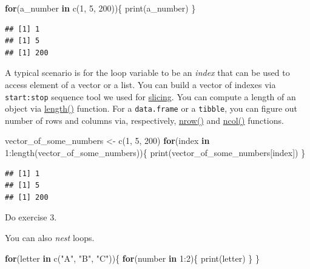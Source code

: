 \documentclass[
]{book}
\newenvironment{Shaded}{\begin{snugshade}}{\end{snugshade}}
\newcommand{\ControlFlowTok}[1]{\textcolor[rgb]{0.13,0.29,0.53}{\textbf{#1}}}
\newcommand{\DecValTok}[1]{\textcolor[rgb]{0.00,0.00,0.81}{#1}}
\newcommand{\FunctionTok}[1]{\textcolor[rgb]{0.00,0.00,0.00}{#1}}
\newcommand{\NormalTok}[1]{#1}
\newcommand{\OtherTok}[1]{\textcolor[rgb]{0.56,0.35,0.01}{#1}}
\newcommand{\SpecialCharTok}[1]{\textcolor[rgb]{0.00,0.00,0.00}{#1}}
\newcommand{\StringTok}[1]{\textcolor[rgb]{0.31,0.60,0.02}{#1}}
\begin{document}
\begin{Shaded}
\begin{Highlighting}[]
\ControlFlowTok{for}\NormalTok{(a\_number }\ControlFlowTok{in} \FunctionTok{c}\NormalTok{(}\DecValTok{1}\NormalTok{, }\DecValTok{5}\NormalTok{, }\DecValTok{200}\NormalTok{))\{}
  \FunctionTok{print}\NormalTok{(a\_number)}
\NormalTok{\}}
\end{Highlighting}
\end{Shaded}

\begin{verbatim}
## [1] 1
## [1] 5
## [1] 200
\end{verbatim}

A typical scenario is for the loop variable to be an \emph{index} that can be used to access element of a vector or a list. You can build a vector of indexes via \texttt{start:stop} sequence tool we used for \protect\hyperlink{vector-index-slicing}{slicing}. You can compute a length of an object via \href{https://stat.ethz.ch/R-manual/R-devel/library/base/html/length.html}{length()} function. For a \texttt{data.frame} or a \texttt{tibble}, you can figure out number of rows and columns via, respectively, \href{https://stat.ethz.ch/R-manual/R-devel/library/base/html/nrow.html}{nrow()} and \href{https://stat.ethz.ch/R-manual/R-devel/library/base/html/nrow.html}{ncol()} functions.

\begin{Shaded}
\begin{Highlighting}[]
\NormalTok{vector\_of\_some\_numbers }\OtherTok{\textless{}{-}} \FunctionTok{c}\NormalTok{(}\DecValTok{1}\NormalTok{, }\DecValTok{5}\NormalTok{, }\DecValTok{200}\NormalTok{)}
\ControlFlowTok{for}\NormalTok{(index }\ControlFlowTok{in} \DecValTok{1}\SpecialCharTok{:}\FunctionTok{length}\NormalTok{(vector\_of\_some\_numbers))\{}
  \FunctionTok{print}\NormalTok{(vector\_of\_some\_numbers[index])}
\NormalTok{\}}
\end{Highlighting}
\end{Shaded}

\begin{verbatim}
## [1] 1
## [1] 5
## [1] 200
\end{verbatim}

Do exercise 3.

You can also \emph{nest} loops.

\begin{Shaded}
\begin{Highlighting}[]
\ControlFlowTok{for}\NormalTok{(letter }\ControlFlowTok{in} \FunctionTok{c}\NormalTok{(}\StringTok{"A"}\NormalTok{, }\StringTok{"B"}\NormalTok{, }\StringTok{"C"}\NormalTok{))\{}
  \ControlFlowTok{for}\NormalTok{(number }\ControlFlowTok{in} \DecValTok{1}\SpecialCharTok{:}\DecValTok{2}\NormalTok{)\{}
    \FunctionTok{print}\NormalTok{(letter)}
\NormalTok{  \}}
\NormalTok{\}}
\end{Highlighting}
\end{Shaded}
\end{document}

